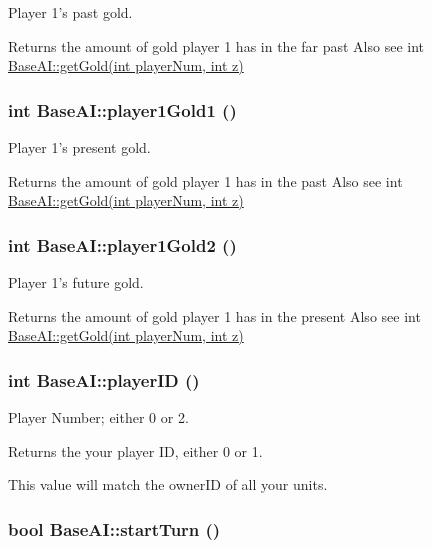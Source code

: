 Player 1's past gold. 

Returns the amount of gold player 1 has in the far past Also see int \hyperlink{classBaseAI_c079405ee4fd5cec789af0f627d3d175}{BaseAI::getGold(int playerNum, int z)} \hypertarget{classBaseAI_cc09926bd744fdf9ec4448366d8b8de7}{
\subsubsection[{player1Gold1}]{\setlength{\rightskip}{0pt plus 5cm}int BaseAI::player1Gold1 ()}}
\label{classBaseAI_cc09926bd744fdf9ec4448366d8b8de7}


Player 1's present gold. 

Returns the amount of gold player 1 has in the past Also see int \hyperlink{classBaseAI_c079405ee4fd5cec789af0f627d3d175}{BaseAI::getGold(int playerNum, int z)} \hypertarget{classBaseAI_35bad13d289478aa2bb628d6e3c56c52}{
\subsubsection[{player1Gold2}]{\setlength{\rightskip}{0pt plus 5cm}int BaseAI::player1Gold2 ()}}
\label{classBaseAI_35bad13d289478aa2bb628d6e3c56c52}


Player 1's future gold. 

Returns the amount of gold player 1 has in the present Also see int \hyperlink{classBaseAI_c079405ee4fd5cec789af0f627d3d175}{BaseAI::getGold(int playerNum, int z)} \hypertarget{classBaseAI_16aab1036653c8f8fb5370cf2f6a3e10}{
\subsubsection[{playerID}]{\setlength{\rightskip}{0pt plus 5cm}int BaseAI::playerID ()}}
\label{classBaseAI_16aab1036653c8f8fb5370cf2f6a3e10}


Player Number; either 0 or 2. 

Returns the your player ID, either 0 or 1.

This value will match the ownerID of all your units. \hypertarget{classBaseAI_c6303df0fece47e29b77dd0aa0aa4fe8}{
\subsubsection[{startTurn}]{\setlength{\rightskip}{0pt plus 5cm}bool BaseAI::startTurn ()}}
\label{classBaseAI_c6303df0fece47e29b77dd0aa0aa4fe8}


